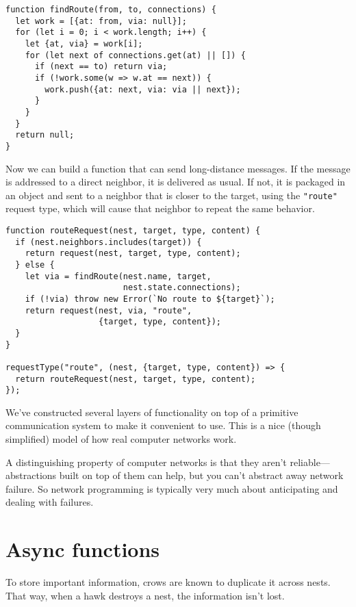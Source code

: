 \begin{lstlisting}
function findRoute(from, to, connections) {
  let work = [{at: from, via: null}];
  for (let i = 0; i < work.length; i++) {
    let {at, via} = work[i];
    for (let next of connections.get(at) || []) {
      if (next == to) return via;
      if (!work.some(w => w.at == next)) {
        work.push({at: next, via: via || next});
      }
    }
  }
  return null;
}
\end{lstlisting}
\noindent

Now we can build a function that can send long-distance messages. If the message is addressed to a direct neighbor, it is delivered as usual. If not, it is packaged in an object and sent to a neighbor that is closer to the target, using the \lstinline`"route"` request type, which will cause that neighbor to repeat the same behavior.

\begin{lstlisting}
function routeRequest(nest, target, type, content) {
  if (nest.neighbors.includes(target)) {
    return request(nest, target, type, content);
  } else {
    let via = findRoute(nest.name, target,
                        nest.state.connections);
    if (!via) throw new Error(`No route to ${target}`);
    return request(nest, via, "route",
                   {target, type, content});
  }
}

requestType("route", (nest, {target, type, content}) => {
  return routeRequest(nest, target, type, content);
});
\end{lstlisting}
\noindent{}

We've constructed several layers of functionality on top of a primitive communication system to make it convenient to use. This is a nice (though simplified) model of how real computer networks work.

A distinguishing property of computer networks is that they aren't reliable—abstractions built on top of them can help, but you can't abstract away network failure. So network programming is typically very much about anticipating and dealing with failures.

\section{Async functions}

To store important information, crows are known to duplicate it across nests. That way, when a hawk destroys a nest, the information isn't lost.

